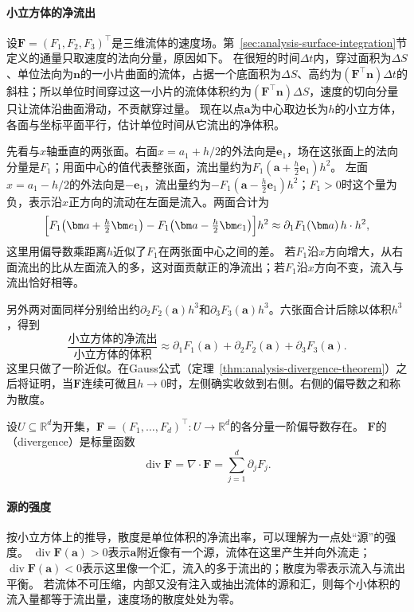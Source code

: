\paragraph{小立方体的净流出}

设$\bm F=(F_1,F_2,F_3)^\top$是三维流体的速度场。第~\ref{sec:analysis-surface-integration}节定义的通量只取速度的法向分量，原因如下。
在很短的时间$\Delta t$内，穿过面积为$\Delta S$、单位法向为$\bm n$的一小片曲面的流体，占据一个底面积为$\Delta S$、高约为$(\bm F^\top\bm n)\Delta t$的斜柱；所以单位时间穿过这一小片的流体体积约为$(\bm F^\top\bm n)\Delta S$，速度的切向分量只让流体沿曲面滑动，不贡献穿过量。
现在以点$\bm a$为中心取边长为$h$的小立方体，各面与坐标平面平行，估计单位时间从它流出的净体积。

先看与$x$轴垂直的两张面。右面$x=a_1+h/2$的外法向是$\bm e_1$，场在这张面上的法向分量是$F_1$；用面中心的值代表整张面，流出量约为$F_1(\bm a+\tfrac h2\bm e_1)h^2$。
左面$x=a_1-h/2$的外法向是$-\bm e_1$，流出量约为$-F_1(\bm a-\tfrac h2\bm e_1)h^2$；$F_1>0$时这个量为负，表示沿$x$正方向的流动在左面是流入。两面合计为
\[
 \Bigl[F_1\bigl(\bm a+\tfrac h2\bm e_1\bigr)-F_1\bigl(\bm a-\tfrac h2\bm e_1\bigr)\Bigr]h^2
 \approx \partial_1F_1(\bm a)\,h\cdot h^2,
\]
这里用偏导数乘距离$h$近似了$F_1$在两张面中心之间的差。
若$F_1$沿$x$方向增大，从右面流出的比从左面流入的多，这对面贡献正的净流出；若$F_1$沿$x$方向不变，流入与流出恰好相等。

另外两对面同样分别给出约$\partial_2F_2(\bm a)h^3$和$\partial_3F_3(\bm a)h^3$。六张面合计后除以体积$h^3$，得到
\[
 \frac{\text{小立方体的净流出}}{\text{小立方体的体积}}
 \approx\partial_1F_1(\bm a)+\partial_2F_2(\bm a)+\partial_3F_3(\bm a).
\]
这里只做了一阶近似。在Gauss公式（定理~\ref{thm:analysis-divergence-theorem}）之后将证明，当$\bm F$连续可微且$h\to0$时，左侧确实收敛到右侧。右侧的偏导数之和称为散度。
\begin{definition}[散度]
\label{def:multivariable-divergence}
设$U\subseteq\mathbb R^d$为开集，$\bm F=(F_1,\ldots,F_d)^\top:U\to\mathbb R^d$的各分量一阶偏导数存在。
$\bm F$的（divergence）是标量函数
\[
 \operatorname{div}\bm F
 =\nabla\mathbin{\cdot}\bm F
 =\sum_{j=1}^d\partial_jF_j.
\]
\end{definition}

\paragraph{源的强度}

按小立方体上的推导，散度是单位体积的净流出率，可以理解为一点处“源”的强度。
$\operatorname{div}\bm F(\bm a)>0$表示$\bm a$附近像有一个源，流体在这里产生并向外流走；$\operatorname{div}\bm F(\bm a)<0$表示这里像一个汇，流入的多于流出的；散度为零表示流入与流出平衡。
若流体不可压缩，内部又没有注入或抽出流体的源和汇，则每个小体积的流入量都等于流出量，速度场的散度处处为零。

